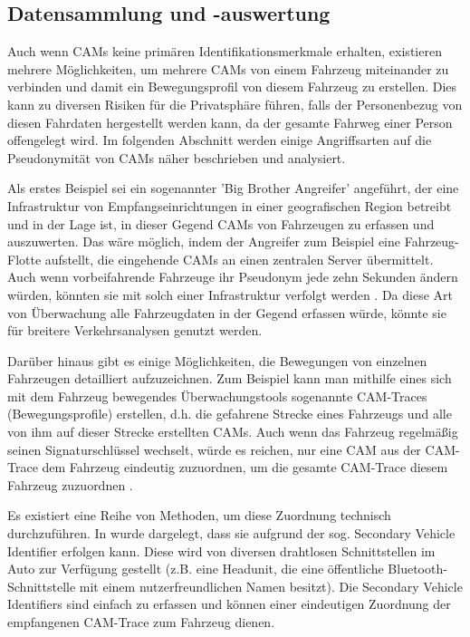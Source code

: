 \subsection{Datensammlung und -auswertung}
\label{sec:FirstContentSection:ThirdSubSection}

Auch wenn CAMs keine primären Identifikationsmerkmale erhalten, existieren mehrere Möglichkeiten, um mehrere CAMs von einem Fahrzeug miteinander zu verbinden und damit ein Bewegungsprofil von diesem Fahrzeug zu erstellen. Dies kann zu diversen Risiken für die Privatsphäre führen, falls der Personenbezug von diesen Fahrdaten hergestellt werden kann, da der gesamte Fahrweg einer Person offengelegt wird. Im folgenden Abschnitt werden einige Angriffsarten auf die Pseudonymität von CAMs näher beschrieben und analysiert. 

Als erstes Beispiel sei ein sogenannter 'Big Brother Angreifer' angeführt, der eine Infrastruktur von Empfangseinrichtungen in einer geografischen Region betreibt und in der Lage ist, in dieser Gegend CAMs von Fahrzeugen zu erfassen und auszuwerten. Das wäre möglich, indem der Angreifer zum Beispiel eine Fahrzeug-Flotte aufstellt, die eingehende CAMs an einen zentralen Server übermittelt. Auch wenn vorbeifahrende Fahrzeuge ihr Pseudonym jede zehn Sekunden ändern würden, könnten sie mit solch einer Infrastruktur verfolgt werden \cite{Wiedersheim2010}. Da diese Art von Überwachung alle Fahrzeugdaten in der Gegend erfassen würde, könnte sie für breitere Verkehrsanalysen genutzt werden.

Darüber hinaus gibt es einige Möglichkeiten, die Bewegungen von einzelnen Fahrzeugen detailliert aufzuzeichnen. Zum Beispiel kann man mithilfe eines sich mit dem Fahrzeug bewegendes Überwachungstools sogenannte CAM-Traces (Bewegungsprofile) erstellen, d.h. die gefahrene Strecke eines Fahrzeugs und alle von ihm auf dieser Strecke erstellten CAMs. Auch wenn das Fahrzeug regelmäßig seinen Signaturschlüssel wechselt, würde es reichen, nur eine CAM aus der CAM-Trace dem Fahrzeug eindeutig zuzuordnen, um die gesamte CAM-Trace diesem Fahrzeug zuzuordnen \cite{Kiometzis2017}. 

Es existiert eine Reihe von Methoden, um diese Zuordnung technisch durchzuführen. In \cite{Ullmann2016} wurde dargelegt, dass sie aufgrund der sog. Secondary Vehicle Identifier erfolgen kann. Diese wird von diversen drahtlosen Schnittstellen im Auto zur Verfügung gestellt (z.B. eine Headunit, die eine öffentliche Bluetooth-Schnittstelle mit einem nutzerfreundlichen Namen besitzt). Die Secondary Vehicle Identifiers sind einfach zu erfassen und können einer eindeutigen Zuordnung der empfangenen CAM-Trace zum Fahrzeug dienen. 

